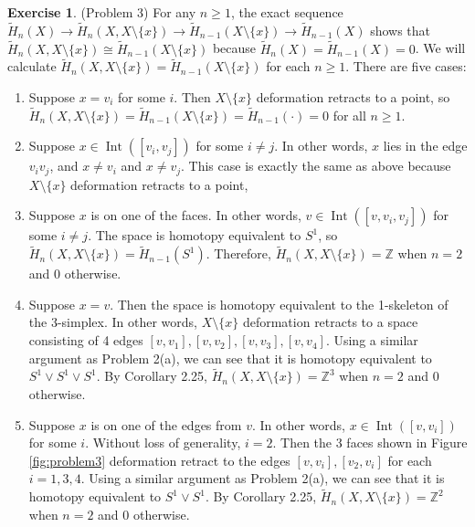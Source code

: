 \documentclass[12pt, psamsfonts]{amsart}
\theoremstyle{definition}
\newtheorem*{exer}{Exercise}
\theoremstyle{remark}
\DeclareMathOperator{\Int}{Int}
\numberwithin{equation}{section}
\begin{document}
\begin{exer}{(Problem 3)}
  For any $n \geq 1$, the exact sequence $\tilde{H}_n(X) \rightarrow \tilde{H}_n(X, X \setminus \{ x \}) \rightarrow \tilde{H}_{n - 1}(X \setminus \{ x \}) \rightarrow \tilde{H}_{n - 1}(X)$ shows that $\tilde{H}_n(X, X \setminus \{ x \}) \cong \tilde{H}_{n - 1}(X \setminus \{ x \})$ because $\tilde{H}_n(X) = \tilde{H}_{n - 1}(X) = 0$.
  We will calculate $\tilde{H}_n(X, X \setminus \{ x \}) = \tilde{H}_{n - 1}(X \setminus \{ x \})$ for each $n \geq 1$.
  There are five cases:
  \begin{enumerate}
    \item 
      Suppose $x = v_i$ for some $i$.
      Then $X \setminus \{ x \}$ deformation retracts to a point, so $\tilde{H}_n(X, X \setminus \{ x \}) = \tilde{H}_{n - 1}(X \setminus \{ x \}) = \tilde{H}_{n - 1}(\cdot) = 0$ for all $n \geq 1$.
    \item
      Suppose $x \in \Int([v_i, v_j])$ for some $i \ne j$.
      In other words, $x$ lies in the edge $v_iv_j$, and $x \ne v_i$ and $x \ne v_j$.
      This case is exactly the same as above because $X \setminus \{ x \}$ deformation retracts to a point,
    \item
      Suppose $x$ is on one of the faces.
      In other words, $v \in \Int([v, v_i, v_j])$ for some $i \ne j$.
      The space is homotopy equivalent to $S^1$, so $\tilde{H}_n(X, X \setminus \{ x \}) = \tilde{H}_{n - 1}(S^1)$.
      Therefore, $\tilde{H}_n(X, X \setminus \{ x \}) = \mathbb{Z}$ when $n = 2$ and 0 otherwise.
    \item
      Suppose $x = v$.
      Then the space is homotopy equivalent to the 1-skeleton of the 3-simplex.
      In other words, $X \setminus \{ x \}$ deformation retracts to a space consisting of 4 edges $[v, v_1], [v, v_2], [v, v_3], [v, v_4]$.
      Using a similar argument as Problem 2(a), we can see that it is homotopy equivalent to $S^1 \vee S^1 \vee S^1$.
      By Corollary 2.25, $\tilde{H}_n(X, X \setminus \{ x \}) = \mathbb{Z}^3$ when $n = 2$ and 0 otherwise.
    \item
      Suppose $x$ is on one of the edges from $v$.
      In other words, $x \in \Int([v, v_i])$ for some $i$.
      Without loss of generality, $i = 2$.
      Then the 3 faces shown in Figure \ref{fig:problem3} deformation retract to the edges $[v, v_i], [v_2, v_i]$ for each $i = 1, 3, 4$.
      Using a similar argument as Problem 2(a), we can see that it is homotopy equivalent to $S^1 \vee S^1$.
      By Corollary 2.25, $\tilde{H}_n(X, X \setminus \{ x \}) = \mathbb{Z}^2$ when $n = 2$ and 0 otherwise.
  \end{enumerate}
\end{exer}
\end{document}
